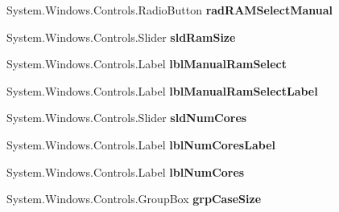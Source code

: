 \begin{DoxyCompactItemize}
\item 
System.\+Windows.\+Controls.\+Radio\+Button {\bfseries rad\+R\+A\+M\+Select\+Manual}\hypertarget{class_p_c_builder_forms_1_1_questionnaire_a7621a4de2b14d731da3e9be5853deedf}{}\label{class_p_c_builder_forms_1_1_questionnaire_a7621a4de2b14d731da3e9be5853deedf}

\item 
System.\+Windows.\+Controls.\+Slider {\bfseries sld\+Ram\+Size}\hypertarget{class_p_c_builder_forms_1_1_questionnaire_a6a563a88382357ef8eee89decdb80e8b}{}\label{class_p_c_builder_forms_1_1_questionnaire_a6a563a88382357ef8eee89decdb80e8b}

\item 
System.\+Windows.\+Controls.\+Label {\bfseries lbl\+Manual\+Ram\+Select}\hypertarget{class_p_c_builder_forms_1_1_questionnaire_a19d7d3f5d3cc2141b9d0798cfe8a9852}{}\label{class_p_c_builder_forms_1_1_questionnaire_a19d7d3f5d3cc2141b9d0798cfe8a9852}

\item 
System.\+Windows.\+Controls.\+Label {\bfseries lbl\+Manual\+Ram\+Select\+Label}\hypertarget{class_p_c_builder_forms_1_1_questionnaire_a5f67de61e73e2579def21ff5bc7ab378}{}\label{class_p_c_builder_forms_1_1_questionnaire_a5f67de61e73e2579def21ff5bc7ab378}

\item 
System.\+Windows.\+Controls.\+Slider {\bfseries sld\+Num\+Cores}\hypertarget{class_p_c_builder_forms_1_1_questionnaire_a7714f0334ab693222eceb856e53aedef}{}\label{class_p_c_builder_forms_1_1_questionnaire_a7714f0334ab693222eceb856e53aedef}

\item 
System.\+Windows.\+Controls.\+Label {\bfseries lbl\+Num\+Cores\+Label}\hypertarget{class_p_c_builder_forms_1_1_questionnaire_ae0a847f6e0a937fe43e28d65b82949ab}{}\label{class_p_c_builder_forms_1_1_questionnaire_ae0a847f6e0a937fe43e28d65b82949ab}

\item 
System.\+Windows.\+Controls.\+Label {\bfseries lbl\+Num\+Cores}\hypertarget{class_p_c_builder_forms_1_1_questionnaire_ae095cf3231846bbb3c840772a127508e}{}\label{class_p_c_builder_forms_1_1_questionnaire_ae095cf3231846bbb3c840772a127508e}

\item 
System.\+Windows.\+Controls.\+Group\+Box {\bfseries grp\+Case\+Size}\hypertarget{class_p_c_builder_forms_1_1_questionnaire_a265f59b48d91297e31afc2bf6f6cc71f}{}\label{class_p_c_builder_forms_1_1_questionnaire_a265f59b48d91297e31afc2bf6f6cc71f}


\end{DoxyCompactItemize}
